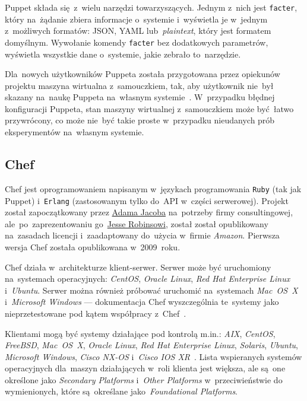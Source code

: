 \documentclass[thesis]{subfiles}
\begin{document}
Puppet składa się~z~wielu narzędzi towarzyszących. Jednym z~nich jest \texttt{facter}, który na~żądanie zbiera informacje o~systemie i~wyświetla je w~jednym z~możliwych formatów: JSON, YAML lub~\emph{plaintext}, który jest formatem domyślnym. Wywołanie komendy \texttt{facter} bez dodatkowych parametrów, wyświetla wszystkie dane o~systemie, jakie zebrało to~narzędzie.

Dla~nowych użytkowników Puppeta została przygotowana przez opiekunów projektu maszyna wirtualna z~samouczkiem, tak, aby użytkownik nie~był skazany na~naukę Puppeta na~własnym systemie~\cite{puppet-vm-tutorial}. W~przypadku błędnej konfiguracji Puppeta, stan maszyny wirtualnej z~samouczkiem może być~łatwo przywrócony, co może nie~być takie proste w~przypadku nieudanych prób eksperymentów na~własnym systemie.


\subsection{Chef}

Chef jest oprogramowaniem napisanym w~językach programowania \texttt{Ruby} (tak jak Puppet) i~\texttt{Erlang} (zastosowanym tylko do~API w~części serwerowej). Projekt został zapoczątkowany przez \href{https://blog.chef.io/author/adam/}{Adama Jacoba} na~potrzeby firmy consultingowej, ale~po~zaprezentowaniu go~\href{https://en.wikipedia.org/wiki/Jesse_Robbins}{Jesse Robinsowi}, został został opublikowany na~zasadach licencji  i~zaadaptowany do~użycia w~firmie \emph{Amazon}. Pierwsza wersja Chef została opublikowana w~2009~roku.

Chef działa w~architekturze klient-serwer. Serwer może być uruchomiony na~systemach operacyjnych: \emph{CentOS}, \emph{Oracle Linux}, \emph{Red Hat Enterprise Linux} i~\emph{Ubuntu}. Serwer można również próbować uruchomić na~systemach \emph{Mac~OS~X} i~\emph{Microsoft Windows} --- dokumentacja Chef wyszczególnia te~systemy jako nieprzetestowane pod kątem współpracy z~Chef~\cite{chef-supported-platforms}.

Klientami mogą być systemy działające pod kontrolą m.in.: \emph{AIX}, \emph{CentOS}, \emph{FreeBSD}, \emph{Mac~OS~X}, \emph{Oracle Linux}, \emph{Red Hat Enterprise Linux}, \emph{Solaris}, \emph{Ubuntu}, \emph{Microsoft Windows}, \emph{Cisco NX-OS} i~\emph{Cisco IOS XR}~\cite{chef-supported-platforms}. Lista wspieranych systemów operacyjnych dla~maszyn działających w~roli klienta jest większa, ale są~one określone jako \emph{Secondary Platforms} i~\emph{Other Platforms} w~przeciwieństwie do wymienionych, które są~określane jako~\emph{Foundational Platforms}.
\end{document}
